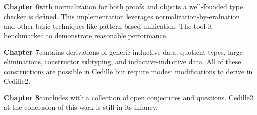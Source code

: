 \textbf{Chapter 6}\quad with normalization for both proofs and objects a well-founded type checker is defined.
This implementation leverages normalization-by-evaluation and other basic techniques like pattern-based unification.
The tool it benchmarked to demonstrate reasonable performance.

\textbf{Chapter 7}\quad contains derivations of generic inductive data, quotient types, large eliminations, constructor subtyping, and inductive-inductive data.
All of these constructions are possible in Cedille but require modest modifications to derive in Cedille2.

\textbf{Chapter 8}\quad concludes with a collection of open conjectures and questions.
Cedille2 at the conclusion of this work is still in its infancy.